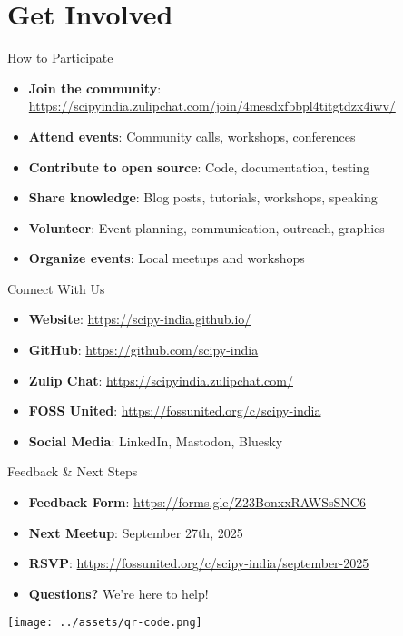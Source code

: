 \documentclass[16pt,t]{beamer}
\begin{document}
\section{Get Involved}

\begin{frame}{How to Participate}
\begin{itemize}
    \item \textbf{Join the community}: \url{https://scipyindia.zulipchat.com/join/4mesdxfbbpl4titgtdzx4iwv/}
    \item \textbf{Attend events}: Community calls, workshops, conferences
    \item \textbf{Contribute to open source}: Code, documentation, testing
    \item \textbf{Share knowledge}: Blog posts, tutorials, workshops, speaking
    \item \textbf{Volunteer}: Event planning, communication, outreach, graphics
    \item \textbf{Organize events}: Local meetups and workshops
\end{itemize}
\end{frame}

\begin{frame}{Connect With Us}
\begin{itemize}
    \item \textbf{Website}: \url{https://scipy-india.github.io/}
    \item \textbf{GitHub}: \url{https://github.com/scipy-india}
    \item \textbf{Zulip Chat}: \url{https://scipyindia.zulipchat.com/}
    \item \textbf{FOSS United}: \url{https://fossunited.org/c/scipy-india}
    \item \textbf{Social Media}: LinkedIn, Mastodon, Bluesky
\end{itemize}
\end{frame}

\begin{frame}{Feedback \& Next Steps}
\begin{itemize}
    \item \textbf{Feedback Form}: \url{https://forms.gle/Z23BonxxRAWSsSNC6}
    \item \textbf{Next Meetup}: September 27th, 2025
    \item \textbf{RSVP}: \url{https://fossunited.org/c/scipy-india/september-2025}
    \item \textbf{Questions?} We're here to help!
\end{itemize}

\begin{center}
    \texttt{[image: ../assets/qr-code.png]}
\end{center}
\end{frame}
\end{document}
